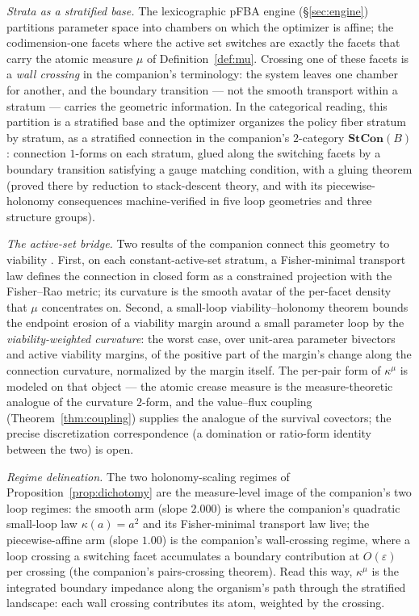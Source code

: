 \documentclass[11pt,a4paper]{article}
\theoremstyle{plain}
\theoremstyle{definition}
\theoremstyle{remark}
\newcommand{\kmu}{\kappa^{\mu}}
\begin{document}
\emph{Strata as a stratified base.} The lexicographic pFBA engine
(\S\ref{sec:engine}) partitions parameter space into chambers on
which the optimizer is affine; the codimension-one facets where the
active set switches are exactly the facets that carry the atomic
measure $\mu$ of Definition~\ref{def:mu}. Crossing one of these
facets is a \emph{wall crossing} in the companion's terminology:
the system leaves one chamber for another, and the boundary
transition --- not the smooth transport within a stratum --- carries
the geometric information. In the categorical reading,
this partition is a stratified base and the optimizer organizes the
policy fiber stratum by stratum, as a stratified connection in the
companion's $2$-category $\mathbf{StCon}(B)$: connection $1$-forms on
each stratum, glued along the switching facets by a boundary
transition satisfying a gauge matching condition, with a gluing
theorem (proved there by reduction to stack-descent theory, and with
its piecewise-holonomy consequences machine-verified in five loop
geometries and three structure groups).

\emph{The active-set bridge.} Two results of the companion connect
this geometry to viability \citep{zai2026categorical}. First, on
each constant-active-set stratum, a Fisher-minimal transport law
defines the connection in closed form as a constrained projection
with the Fisher--Rao metric; its curvature is the smooth avatar of
the per-facet density that $\mu$ concentrates on. Second, a
small-loop viability--holonomy theorem bounds the endpoint erosion
of a viability margin around a small parameter loop by the
\emph{viability-weighted curvature}:
the worst case, over unit-area parameter bivectors and active
viability margins, of the positive part of the margin's change along
the connection curvature, normalized by the margin itself. The
per-pair form of
$\kmu$ is modeled on that object --- the atomic crease measure is
the measure-theoretic analogue of the curvature $2$-form, and the
value--flux coupling (Theorem~\ref{thm:coupling}) supplies the
analogue of the survival covectors; the precise discretization
correspondence (a domination or ratio-form identity between the two)
is open.

\emph{Regime delineation.} The two holonomy-scaling regimes of
Proposition~\ref{prop:dichotomy} are the measure-level image of the
companion's two loop regimes: the smooth arm (slope $2.000$) is
where the companion's quadratic small-loop law $\kappa(a) = a^{2}$
and its Fisher-minimal transport law live; the piecewise-affine
arm (slope $1.00$) is the companion's wall-crossing regime, where
a loop crossing a switching facet accumulates a boundary
contribution at $O(\varepsilon)$ per crossing (the companion's
pairs-crossing theorem). Read this way, $\kmu$ is the integrated
boundary impedance along the organism's path through the stratified
landscape: each wall crossing contributes its atom, weighted by
the crossing.
\end{document}

